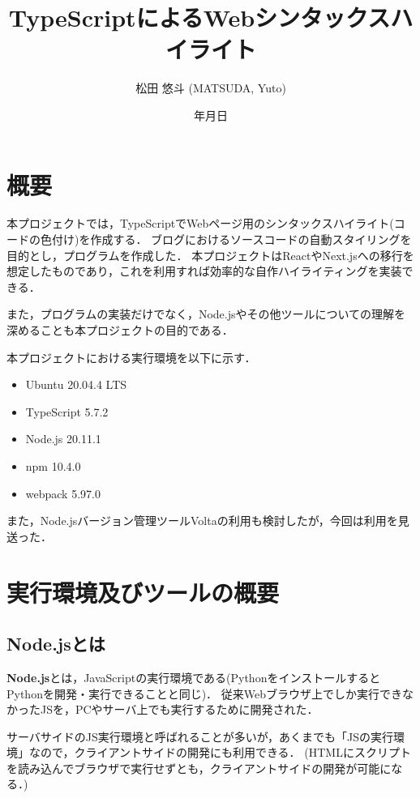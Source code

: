\documentclass[autodetect-engine,dvi=dvipdfmx,ja=standard,
               a4j,11pt]{bxjsarticle}
\title{TypeScriptによるWebシンタックスハイライト}
\author{松田 悠斗 (MATSUDA, Yuto)}
\date{\number\year 年\number\month 月\number\day 日}
\begin{document}
\maketitle

\section{概要}

本プロジェクトでは，TypeScriptでWebページ用のシンタックスハイライト(コードの色付け)を作成する．
ブログにおけるソースコードの自動スタイリングを目的とし，プログラムを作成した．
本プロジェクトはReactやNext.jsへの移行を想定したものであり，これを利用すれば効率的な自作ハイライティングを実装できる．

また，プログラムの実装だけでなく，Node.jsやその他ツールについての理解を深めることも本プロジェクトの目的である．

本プロジェクトにおける実行環境を以下に示す．

\begin{itemize}
  \item Ubuntu 20.04.4 LTS
  \item TypeScript 5.7.2
  \item Node.js 20.11.1
  \item npm 10.4.0
  \item webpack 5.97.0
\end{itemize}

また，Node.jsバージョン管理ツールVoltaの利用も検討したが，今回は利用を見送った．

\section{実行環境及びツールの概要}

\subsection{Node.jsとは}

{\bf Node.js}とは，JavaScriptの実行環境である(PythonをインストールするとPythonを開発・実行できることと同じ)．
従来Webブラウザ上でしか実行できなかったJSを，PCやサーバ上でも実行するために開発された．

サーバサイドのJS実行環境と呼ばれることが多いが，あくまでも「JSの実行環境」なので，クライアントサイドの開発にも利用できる．
(HTMLにスクリプトを読み込んでブラウザで実行せずとも，クライアントサイドの開発が可能になる．)
\end{document}
